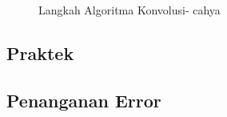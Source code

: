 \begin{enumerate}
\begin{itemize}
\begin{figure}[!hbtp]
\caption{Langkah Algoritma Konvolusi- cahya}
\label{chapter-7-13-cahya}
\end{figure}
\par
\par
\end{itemize}
\end{enumerate}


\subsection{Praktek}


\subsection{Penanganan Error}

